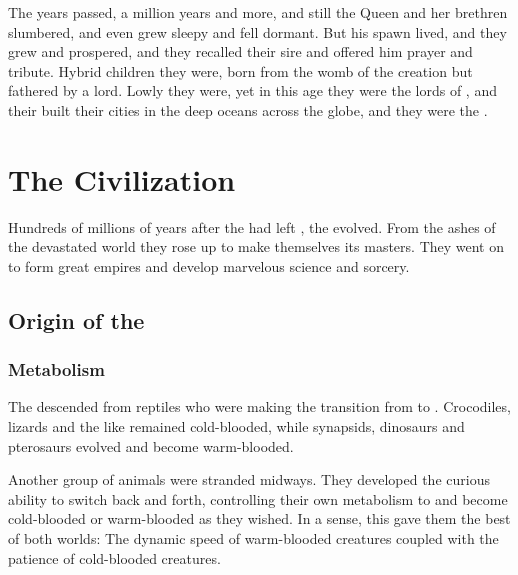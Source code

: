 The years passed, a million years and more, and still the \Kraken{} Queen and her brethren slumbered, and even \Moroch{} grew sleepy and fell dormant. But his spawn lived, and they grew and prospered, and they recalled their sire and offered him prayer and tribute. Hybrid children they were, born from the womb of the \psp{\voyagers} creation but fathered by a \kraken{} lord. Lowly they were, yet in this age they were the lords of \Miith{}, and their built their cities in the deep oceans across the globe, and they were the \nagae{}. 















\section{The \Ophidian{} Civilization}
Hundreds of millions of years after the \voyagers{} had left \Miith{}, the \ophidians{} evolved. 
From the ashes of the devastated world they rose up to make themselves its masters.
They went on to form great empires and develop marvelous science and sorcery.









\subsection{Origin of the \ophidians}
\subsubsection{Metabolism}
The \ophidians{} descended from reptiles who were making the transition from  to . 
Crocodiles, lizards and the like remained cold-blooded, while synapsids, dinosaurs and pterosaurs evolved and become warm-blooded. 

Another group of animals were stranded midways. 
They developed the curious ability to switch back and forth, controlling their own metabolism to  and become cold-blooded or warm-blooded as they wished. 
In a sense, this gave them the best of both worlds: 
The dynamic speed of warm-blooded creatures coupled with the patience of cold-blooded creatures. 

